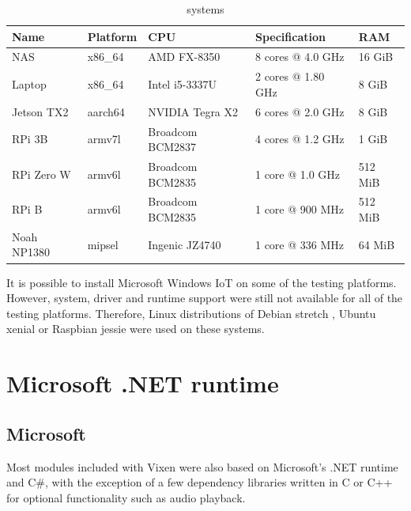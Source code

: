 \begin{table}[t]
  \centering
  \begin{tabular}{l|l|l|l|l}
    \hline
    \textbf{Name} & \textbf{Platform} & \textbf{CPU} & \textbf{Specification} & \textbf{RAM} \\ \hline
    \hline
    NAS         & x86\_64 & AMD FX-8350       & 8 cores @ 4.0 GHz   & 16 GiB  \\ \hline
    Laptop      & x86\_64 & Intel i5-3337U    & 2 cores @ 1.80 GHz  & 8 GiB   \\ \hline
    Jetson TX2  & aarch64 & NVIDIA Tegra X2   & 6 cores @ 2.0 GHz   & 8 GiB   \\ \hline
    RPi 3B      & armv7l  & Broadcom BCM2837  & 4 cores @ 1.2 GHz   & 1 GiB   \\ \hline
    RPi Zero W  & armv6l  & Broadcom BCM2835  & 1 core @ 1.0 GHz    & 512 MiB \\ \hline
    RPi B       & armv6l  & Broadcom BCM2835  & 1 core @ 900 MHz    & 512 MiB \\ \hline
    Noah NP1380 & mipsel  & Ingenic JZ4740    & 1 core @ 336 MHz    & 64 MiB  \\ \hline
  \end{tabular}
  \caption{\footnotesize {} systems}
  \label{tbl:linux}
\end{table}

It is possible to install Microsoft Windows IoT  on some of the testing platforms. However, system, driver and runtime support were still not available for all of the testing platforms. Therefore,  \cite{debian} Linux distributions of Debian stretch \cite{debian}, Ubuntu xenial \cite{ubuntu} or Raspbian jessie \cite{raspbian} were used on these systems.

\newpage

\section{Microsoft .NET runtime}

\subsection{Microsoft }

Most modules included with Vixen were also based on Microsoft's .NET runtime and C\#, with the exception of a few dependency libraries written in C \cite{kernighan1988c} or C++ \cite{stroustrup1995c++} for optional functionality such as audio playback.

